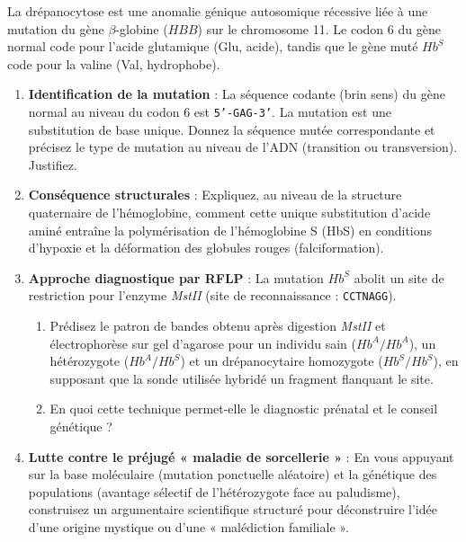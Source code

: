 \documentclass[11pt]{article}
\begin{document}
\begin{exercice}
La drépanocytose est une anomalie génique autosomique récessive liée à une mutation du gène $\beta$-globine ($HBB$) sur le chromosome 11. Le codon 6 du gène normal code pour l'acide glutamique (Glu, acide), tandis que le gène muté $Hb^S$ code pour la valine (Val, hydrophobe).

\begin{enumerate}
    \item \textbf{Identification de la mutation} : La séquence codante (brin sens) du gène normal au niveau du codon 6 est \texttt{5'-GAG-3'}. La mutation est une substitution de base unique. Donnez la séquence mutée correspondante et précisez le type de mutation au niveau de l'ADN (transition ou transversion). Justifiez.
    \item \textbf{Conséquence structurales} : Expliquez, au niveau de la structure quaternaire de l'hémoglobine, comment cette unique substitution d'acide aminé entraîne la polymérisation de l'hémoglobine S (HbS) en conditions d'hypoxie et la déformation des globules rouges (falciformation).
    \item \textbf{Approche diagnostique par RFLP} : La mutation $Hb^S$ abolit un site de restriction pour l'enzyme \textit{MstII} (site de reconnaissance : \texttt{CCTNAGG}). 
    \begin{enumerate}
        \item Prédisez le patron de bandes obtenu après digestion \textit{MstII} et électrophorèse sur gel d'agarose pour un individu sain ($Hb^A/Hb^A$), un hétérozygote ($Hb^A/Hb^S$) et un drépanocytaire homozygote ($Hb^S/Hb^S$), en supposant que la sonde utilisée hybridé un fragment flanquant le site.
        \item En quoi cette technique permet-elle le diagnostic prénatal et le conseil génétique ?
    \end{enumerate}
    \item \textbf{Lutte contre le préjugé « maladie de sorcellerie »} : En vous appuyant sur la base moléculaire (mutation ponctuelle aléatoire) et la génétique des populations (avantage sélectif de l'hétérozygote face au paludisme), construisez un argumentaire scientifique structuré pour déconstruire l'idée d'une origine mystique ou d'une « malédiction familiale ».
\end{enumerate}
\end{exercice}
\end{document}
